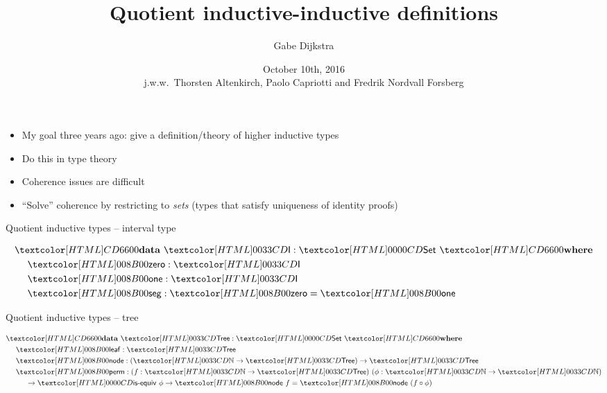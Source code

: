 

\title{Quotient inductive-inductive definitions}

\author[Gabe Dijkstra]{
  Gabe Dijkstra
}


\date[October 10th, 2016]{October 10th, 2016 \\ \vspace{1cm} \small{j.w.w.\ Thorsten Altenkirch, Paolo Capriotti and Fredrik Nordvall Forsberg}}




\begin{frame}
\maketitle
\end{frame}

\begin{frame}
  \begin{itemize}
  \item My goal three years ago: give a definition/theory of higher inductive types
  \item Do this in type theory
  \item Coherence issues are difficult
  \item ``Solve'' coherence by restricting to \emph{sets} (types that satisfy uniqueness of identity proofs)
  \end{itemize}
\end{frame}

\begin{frame}{Quotient inductive types -- interval type}

  \begin{align*}
    &\data\ \intty : \Set\ \where \\
    &\ \ \ \ \intzero : \intty \\
    &\ \ \ \ \intone : \intty \\
    &\ \ \ \ \intseg : \intzero = \intone 
  \end{align*}
  
\end{frame}

\begin{frame}{Quotient inductive types -- tree}

  \begin{align*}
    &\data\ \treety : \Set\ \where \\
    &\ \ \ \ \treeleaf : \treety \\
    &\ \ \ \ \treenode : (\natty \to \treety) \to \treety \\
    &\ \ \ \ \treeperm : (f : \natty \to \treety)\ (\phi : \natty \to \natty) \\
    &\ \ \ \ \ \ \ \ \to \isequiv\ \phi \to \treenode\ f = \treenode\ (f \circ \phi)
  \end{align*}
\end{frame}

